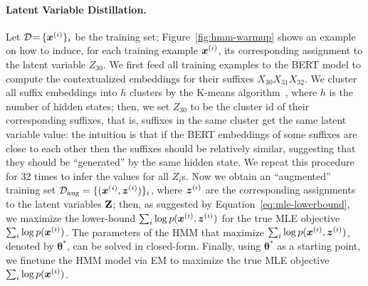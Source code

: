 \documentclass{article} %
\newcommand{\anji}[1]{\textcolor{purple}{\textbf{[Anji: #1]}}}
\begin{document}


\paragraph{Latent Variable Distillation.} Let $\mathcal{D} \!=\! \{\boldsymbol{x}^{(i)}\}_{i}$ be the training set; Figure~\ref{fig:hmm-warmup} shows an example on how to induce, for each training example $\boldsymbol{x}^{(i)}$, its corresponding assignment to the latent variable $Z_{30}$. We first feed all training examples to the BERT model to compute the contextualized embeddings for their suffixes $X_{30}X_{31}X_{32}$.
We cluster all suffix embeddings into $h$ clusters by the K-means algorithm~\citep{lloyd1982least}, where $h$ is the number of hidden states; then, we set $Z_{30}$ to be the cluster id of their corresponding suffixes, that is, suffixes in the same cluster get the same latent variable value:
the intuition is that if the BERT embeddings of some suffixes are close to each other then the suffixes should be relatively similar, suggesting that they should be ``generated'' by the same hidden state. We repeat this procedure for 32 times to infer the values for all $Z_i$s. Now we obtain an ``augmented'' training set ${\mathcal{D}_{\mathrm{aug}}} = \{(\boldsymbol{x}^{(i)}, \boldsymbol{z}^{(i)})\}_{i}$, where $\boldsymbol{z}^{(i)}$ are the corresponding assignments to the latent variables $\mathbf{Z}$; then, as suggested by Equation~\ref{eq:mle-lowerbound}, we maximize the lower-bound $\sum_{i}\log{p}(\boldsymbol{x}^{(i)}, \boldsymbol{z}^{(i)})$ for the true MLE objective $\sum_{i}\log{p}(\boldsymbol{x}^{(i)})$. The parameters of the HMM that maximize $\sum_{i} \log {p}(\boldsymbol{x}^{(i)}, \boldsymbol{z}^{(i)})$, denoted by $\mathbf{\theta}^{*}$, can be solved in closed-form. Finally, using $\mathbf{\theta}^{*}$ as a starting point, we finetune the HMM model via EM to maximize the true MLE objective $\sum_{i}\log{p}(\boldsymbol{x}^{(i)})$. 
\end{document}

